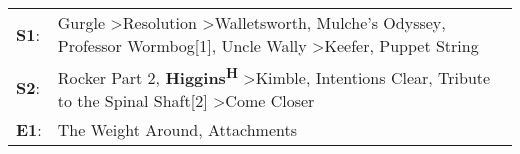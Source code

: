 \begin{supertabular}{p{0.03\textwidth}p{0.92\textwidth}}
 \textbf{S1}:  &  Gurgle\textsuperscript{} \textgreater \enspace Resolution\textsuperscript{} \textgreater \enspace Walletsworth\textsuperscript{}, \enspace Mulche's Odyssey\textsuperscript{}, \enspace Professor Wormbog[1]\textsuperscript{}, \enspace Uncle Wally\textsuperscript{} \textgreater \enspace Keefer\textsuperscript{}, \enspace Puppet String\textsuperscript{}  \enspace  \\
 \textbf{S2}:  &                                                                         Rocker Part 2\textsuperscript{}, \enspace \textbf{Higgins\textsuperscript{H}} \textgreater \enspace Kimble\textsuperscript{}, \enspace Intentions Clear\textsuperscript{}, \enspace Tribute to the Spinal Shaft[2]\textsuperscript{} \textgreater \enspace Come Closer\textsuperscript{}  \enspace  \\
 \textbf{E1}:  &                                                                                                                                                                                                                                                                                      The Weight Around\textsuperscript{}, \enspace Attachments\textsuperscript{}  \enspace  \\
\end{supertabular}
